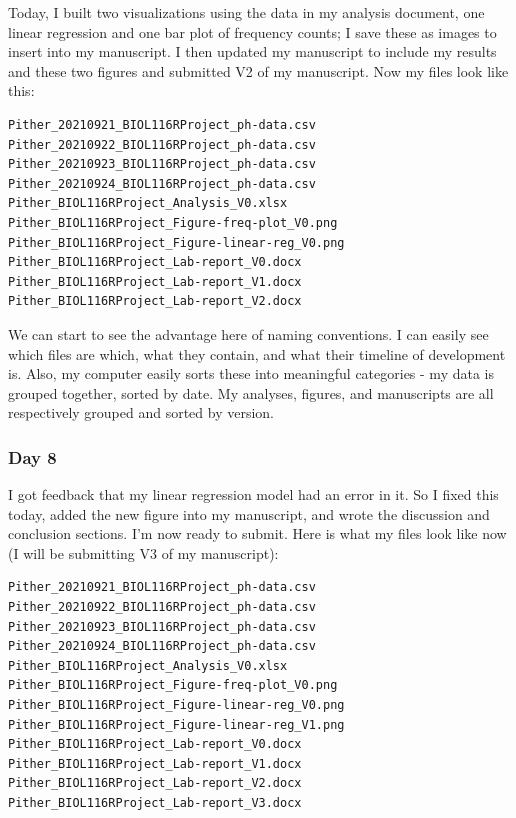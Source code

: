 \documentclass[
]{book}
\begin{document}
Today, I built two visualizations using the data in my analysis document, one linear regression and one bar plot of frequency counts; I save these as images to insert into my manuscript. I then updated my manuscript to include my results and these two figures and submitted V2 of my manuscript. Now my files look like this:

\begin{verbatim}
Pither_20210921_BIOL116RProject_ph-data.csv
Pither_20210922_BIOL116RProject_ph-data.csv
Pither_20210923_BIOL116RProject_ph-data.csv
Pither_20210924_BIOL116RProject_ph-data.csv
Pither_BIOL116RProject_Analysis_V0.xlsx
Pither_BIOL116RProject_Figure-freq-plot_V0.png
Pither_BIOL116RProject_Figure-linear-reg_V0.png
Pither_BIOL116RProject_Lab-report_V0.docx
Pither_BIOL116RProject_Lab-report_V1.docx
Pither_BIOL116RProject_Lab-report_V2.docx
\end{verbatim}

We can start to see the advantage here of naming conventions. I can easily see which files are which, what they contain, and what their timeline of development is. Also, my computer easily sorts these into meaningful categories - my data is grouped together, sorted by date. My analyses, figures, and manuscripts are all respectively grouped and sorted by version.

\hypertarget{day-8}{%
\subsubsection*{Day 8}\label{day-8}}

I got feedback that my linear regression model had an error in it. So I fixed this today, added the new figure into my manuscript, and wrote the discussion and conclusion sections. I'm now ready to submit. Here is what my files look like now (I will be submitting V3 of my manuscript):

\begin{verbatim}
Pither_20210921_BIOL116RProject_ph-data.csv
Pither_20210922_BIOL116RProject_ph-data.csv
Pither_20210923_BIOL116RProject_ph-data.csv
Pither_20210924_BIOL116RProject_ph-data.csv
Pither_BIOL116RProject_Analysis_V0.xlsx
Pither_BIOL116RProject_Figure-freq-plot_V0.png
Pither_BIOL116RProject_Figure-linear-reg_V0.png
Pither_BIOL116RProject_Figure-linear-reg_V1.png
Pither_BIOL116RProject_Lab-report_V0.docx
Pither_BIOL116RProject_Lab-report_V1.docx
Pither_BIOL116RProject_Lab-report_V2.docx
Pither_BIOL116RProject_Lab-report_V3.docx
\end{verbatim}
\end{document}
